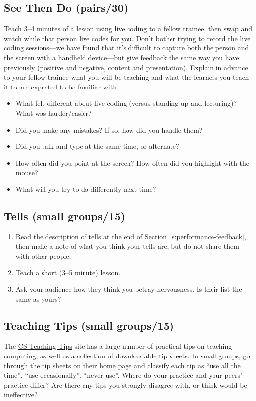 \subsection*{See Then Do (pairs/30)}

Teach 3--4 minutes of a lesson using live coding to a fellow trainee,
then swap and watch while that person live codes for you. Don't bother
trying to record the live coding sessions---we have found that it's
difficult to capture both the person and the screen with a handheld
device---but give feedback the same way you have previously (positive and
negative, content and presentation). Explain in advance to your fellow
trainee what you will be teaching and what the learners you teach it to
are expected to be familiar with.

\begin{itemize}
\item
  What felt different about live coding (versus standing up and
  lecturing)? What was harder/easier?
\item
  Did you make any mistakes? If so, how did you handle them?
\item
  Did you talk and type at the same time, or alternate?
\item
  How often did you point at the screen? How often did you highlight
  with the mouse?
\item
  What will you try to do differently next time?
\end{itemize}

\subsection*{Tells (small groups/15)}

\begin{enumerate}
\item
  Read the description of tells at the end of
  Section~\ref{s:performance-feedback}, then make a note of what you
  think your tells are, but do not share them with other people.
\item
  Teach a short (3--5 minute) lesson.
\item
  Ask your audience how they think you betray nervousness. Is their
  list the same as yours?
\end{enumerate}

\subsection*{Teaching Tips (small groups/15)}

The \href{http://csteachingtips.org/}{CS Teaching Tips} site has a large number of
practical tips on teaching computing, as well as a collection of
downloadable tip sheets. In small groups, go through the tip sheets on
their home page and classify each tip as ``use all the time'', ``use
occasionally'', ``never use''. Where do your practice and your peers'
practice differ? Are there any tips you strongly disagree with, or
think would be ineffective?

